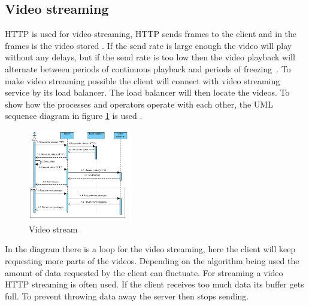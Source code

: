 \documentclass{sig-alternate-br}
\begin{document}
\subsection{Video streaming}\label{sec:stream}
HTTP is used for video streaming, HTTP sends frames to the client and in the frames is the video stored \cite{computer-networking}. If the send rate is large enough the video will play without any delays, but if the send rate is too low then the video playback will alternate between periods of continuous playback and periods of freezing~\cite{computer-networking}. \newline 
To make video streaming possible the client will connect with video streaming service by its load balancer. The load balancer will then locate the videos. To show how the processes and operators operate with each other, the UML sequence diagram in figure \ref{fig:stream} is used \cite{Bernardi:2002:USD:584369.584376}. 
\begin{figure}[H]
	\centering 
	\includegraphics[width=0.4\textwidth]{VideoStreaming.jpg}
	\caption{Video stream}
	\label{fig:stream} %
\end{figure}

In the diagram there is a loop for the video streaming, here the client will keep requesting more parts of the videos. Depending on the algorithm being used the amount of data requested by the client can fluctuate. For streaming a video HTTP streaming is often used. If the client receives too much data its buffer gets full. To prevent throwing data away the server then stops sending.
\end{document}
